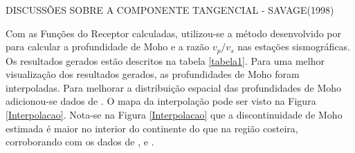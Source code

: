DISCUSSÕES SOBRE A COMPONENTE TANGENCIAL - SAVAGE(1998)

Com as Funções do Receptor calculadas, utilizou-se a método desenvolvido por \cite{Zhu_Kanamori_2000} para calcular a profundidade de Moho e a razão $v_{p}/v_{s}$ nas estações sismográficas. Os resultados gerados estão descritos na tabela \ref{tabela1}. Para uma melhor visualização dos resultados gerados, as profundidades de Moho foram interpoladas. Para melhorar a distribuição espacial das profundidades de Moho adicionou-se dados de \cite{Assumpcao_Brazil_2013}. O mapa da interpolação pode ser visto na Figura \ref{Interpolacao}. Nota-se na Figura \ref{Interpolacao} que a discontinuidade de Moho estimada é maior no interior do continente do que na região costeira, corroborando com os dados de \cite{Assumpcao_America_2013}, \citep{Assumpcao_Brazil_2013} e \cite{van_der_meijde_gravity_2013} . 


